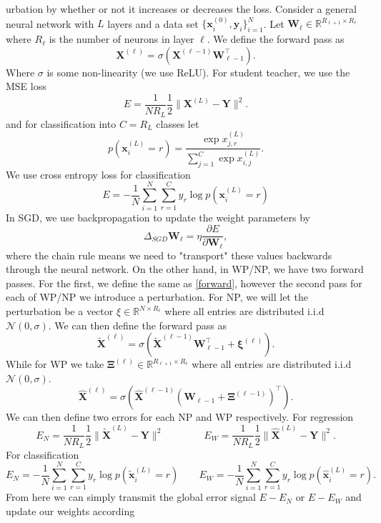 \documentclass{article}
\def\R{\mathbb{R}}
\def\*#1{\mathbf{#1}}
\begin{document}
urbation by whether or not it increases or decreases
the loss. Consider a general neural network with $L$ layers and a data set $\{\*x_i^{(0)},\*y_i\}_{i=1}^N$. 
Let $\*W_{\ell} \in \R^{R_{\ell+1} \times R_{\ell}}$ where $R_\ell$ is the number of 
neurons in layer $\ell$. We define the forward pass as
\begin{equation}\label{forward}\*X^{(\ell)} = \sigma\left( \*X^{(\ell-1)}\*W_{\ell-1}^\top\right).\end{equation}
Where $\sigma$ is some non-linearity (we use ReLU). For student teacher, we use the MSE loss 
\begin{equation}
\label{mseloss}
E = \frac{1}{NR_L}\frac 12 \| \*X^{(L)}- \*Y\|^2.
\end{equation}
and for classification into $C = R_L$ classes let 
\begin{equation}
\label{crossentropy}
p(\*x_i^{(L)} = r) = \frac{\exp x_{j,r}^{(L)}}{\sum_{j=1}^C \exp x_{i,j}^{(L)}}.
\end{equation}
We use cross entropy loss for classification
\[E = -\frac 1N \sum_{i=1}^N \sum_{r=1}^C y_r \log p(\*x_i^{(L)} = r) \]
In SGD, we use backpropagation to update the weight parameters by 
\[\Delta_{SGD} \* W_{\ell} = \eta\frac{\partial E}{\partial \*W_{\ell}},\] 
where the chain rule means we 
need to "transport" these values backwards through the neural network. On the other 
hand, in WP/NP, we have two forward passes. For the first, we define the same as \ref{forward}, 
however the second pass for each of WP/NP we introduce a perturbation. For NP, we will let the 
perturbation be a vector $\xi \in \R^{N\times R_{\ell}}$ where all entries are distributed 
i.i.d $\mathcal{N}(0,\sigma)$. We can then define the forward pass as 
\[ \widetilde{\*X}^{(\ell)} = \sigma\left(\widetilde{\*X}^{(\ell-1)}\*W_{\ell -1}^\top + \*\xi^{(\ell)} \right).\]
While for WP we take $\*\Xi^{(\ell)} \in \R^{R_{\ell + 1 }\times R_\ell}$ where all entries are distributed 
i.i.d $\mathcal{N}(0,\sigma)$. 
\[ \hat{\*X}^{(\ell)} = \sigma\left( \hat{\*X}^{(\ell-1)}\left(\*W_{\ell -1} + \*\Xi^{(\ell-1)}\right)^\top  \right).\]
We can then define two errors for each NP and WP respectively. For regression
\[ E_N = \frac{1}{NR_L} \frac 12 \| \widetilde{\* X}^{(L)} - \* Y \|^2 \qquad\qquad E_W = \frac{1}{NR_L} \frac 12 \| \hat{\* X}^{(L)} - \* Y \|^2. \]
For classification
\[E_N  =  -\frac 1N \sum_{i=1}^N \sum_{r=1}^C y_r \log p(\widetilde{\*x}_i^{(L)} = r) \qquad E_W =  -\frac 1N \sum_{i=1}^N \sum_{r=1}^C y_r \log p(\hat{\*x}_i^{(L)} = r).\]
From here we can simply transmit the global error signal $E-E_N$ or $E-E_W$ and update our weights according
\end{document}
